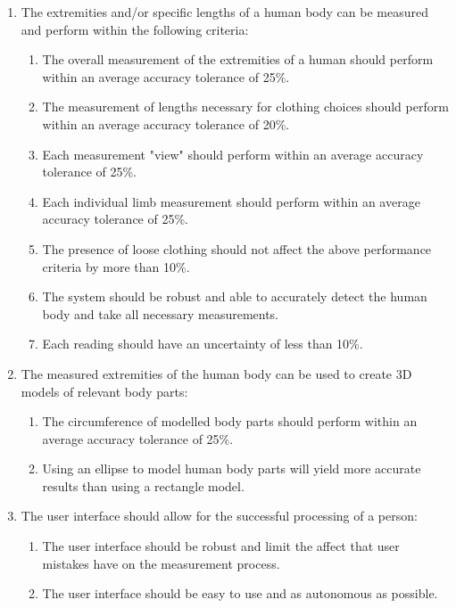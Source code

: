 \begin{enumerate}
	\item The extremities and/or specific lengths of a human body can be measured and perform within the following criteria:
	\begin{enumerate}
		\item The overall measurement of the extremities of a human should perform within an average accuracy tolerance of 25\%.
		\item The measurement of lengths necessary for clothing choices should perform within an average accuracy tolerance of 20\%.
		\item Each measurement "view" should perform within an average accuracy tolerance of 25\%.
		\item Each individual limb measurement should perform within an average accuracy tolerance of 25\%.
		\item The presence of loose clothing should not affect the above performance criteria by more than 10\%.
		\item The system should be robust and able to accurately detect the human body and take all necessary measurements. 
		\item Each reading should have an uncertainty of less than 10\%.
	\end{enumerate}
	\item The measured extremities of the human body can be used to create 3D models of relevant body parts: 
	\begin{enumerate}
		\item The circumference of modelled body parts should perform within an average accuracy tolerance of 25\%.
		\item Using an ellipse to model human body parts will yield more accurate results than using a rectangle model. 
	\end{enumerate}
	\item The user interface should allow for the successful processing of a person: 
	\begin{enumerate}
		\item The user interface should be robust and limit the affect that user mistakes have on the measurement process.
		\item The user interface should be easy to use and as autonomous as possible.
	\end{enumerate}
\end{enumerate}
